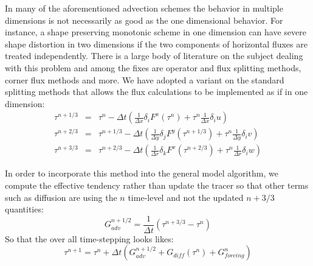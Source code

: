 In many of the aforementioned advection schemes the behavior in
multiple dimensions is not necessarily as good as the one dimensional
behavior. For instance, a shape preserving monotonic scheme in one
dimension can have severe shape distortion in two dimensions if the
two components of horizontal fluxes are treated independently. There
is a large body of literature on the subject dealing with this problem
and among the fixes are operator and flux splitting methods, corner
flux methods and more. We have adopted a variant on the standard
splitting methods that allows the flux calculations to be implemented
as if in one dimension:
\begin{eqnarray}
\tau^{n+1/3} & = & \tau^{n}
- \Delta t \left( \frac{1}{\Delta x} \delta_i F^x(\tau^{n})
           + \tau^{n} \frac{1}{\Delta x} \delta_i u \right) \\
\tau^{n+2/3} & = & \tau^{n+1/3}
- \Delta t \left( \frac{1}{\Delta y} \delta_j F^y(\tau^{n+1/3})
           + \tau^{n} \frac{1}{\Delta y} \delta_i v \right) \\
\tau^{n+3/3} & = & \tau^{n+2/3}
- \Delta t \left( \frac{1}{\Delta r} \delta_k F^x(\tau^{n+2/3})
           + \tau^{n} \frac{1}{\Delta r} \delta_i w \right)
\end{eqnarray}

In order to incorporate this method into the general model algorithm,
we compute the effective tendency rather than update the tracer so
that other terms such as diffusion are using the $n$ time-level and
not the updated $n+3/3$ quantities:
\begin{equation}
G^{n+1/2}_{adv} = \frac{1}{\Delta t} ( \tau^{n+3/3} - \tau^{n} )
\end{equation}
So that the over all time-stepping looks likes:
\begin{equation}
\tau^{n+1} = \tau^{n} + \Delta t \left( G^{n+1/2}_{adv} + G_{diff}(\tau^{n}) + G^{n}_{forcing} \right)
\end{equation}



